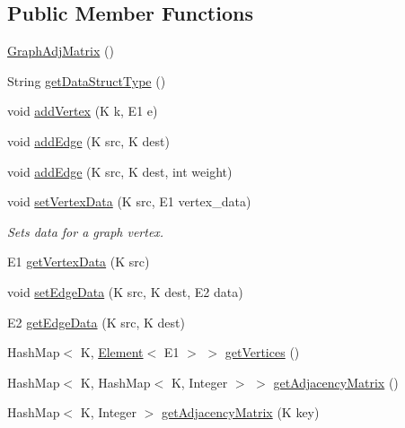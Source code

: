 \subsection*{Public Member Functions}
\begin{DoxyCompactItemize}
\item 
\hyperlink{classbridges_1_1base_1_1_graph_adj_matrix_a8af4a2575890c3e68da7b39d800267bb}{Graph\+Adj\+Matrix} ()
\item 
String \hyperlink{classbridges_1_1base_1_1_graph_adj_matrix_a16ee088c4c53a9a5cdf3fbbad25cd1af}{get\+Data\+Struct\+Type} ()
\item 
void \hyperlink{classbridges_1_1base_1_1_graph_adj_matrix_a27b5ddb10a6615693460955b6bb3ee0c}{add\+Vertex} (K k, E1 e)
\item 
void \hyperlink{classbridges_1_1base_1_1_graph_adj_matrix_a477fbb5abbed6988e67b4b46b571e87c}{add\+Edge} (K src, K dest)
\item 
void \hyperlink{classbridges_1_1base_1_1_graph_adj_matrix_ad9b05b61e9592fa94045d7b59971b206}{add\+Edge} (K src, K dest, int weight)
\item 
void \hyperlink{classbridges_1_1base_1_1_graph_adj_matrix_a22eee632463a665e7016cf50916dfd83}{set\+Vertex\+Data} (K src, E1 vertex\+\_\+data)
\begin{DoxyCompactList}\small\item\em Sets data for a graph vertex. \end{DoxyCompactList}\item 
E1 \hyperlink{classbridges_1_1base_1_1_graph_adj_matrix_a36308a365d1c0f137ffb9a8e76a630f1}{get\+Vertex\+Data} (K src)
\item 
void \hyperlink{classbridges_1_1base_1_1_graph_adj_matrix_a72fe8bd594e3da28ba6e412de88576da}{set\+Edge\+Data} (K src, K dest, E2 data)
\item 
E2 \hyperlink{classbridges_1_1base_1_1_graph_adj_matrix_a3a3795c994ef9033ddb0b1d97029350b}{get\+Edge\+Data} (K src, K dest)
\item 
Hash\+Map$<$ K, \hyperlink{classbridges_1_1base_1_1_element}{Element}$<$ E1 $>$ $>$ \hyperlink{classbridges_1_1base_1_1_graph_adj_matrix_a6a000a302a1082bc2c55fbe8f511fce4}{get\+Vertices} ()
\item 
Hash\+Map$<$ K, Hash\+Map$<$ K, Integer $>$ $>$ \hyperlink{classbridges_1_1base_1_1_graph_adj_matrix_abe7f26cb9874744bc044df18b5d0eb84}{get\+Adjacency\+Matrix} ()
\item 
Hash\+Map$<$ K, Integer $>$ \hyperlink{classbridges_1_1base_1_1_graph_adj_matrix_a43f830cfe126f2be351f6d8c2fccc569}{get\+Adjacency\+Matrix} (K key)

\end{DoxyCompactItemize}
